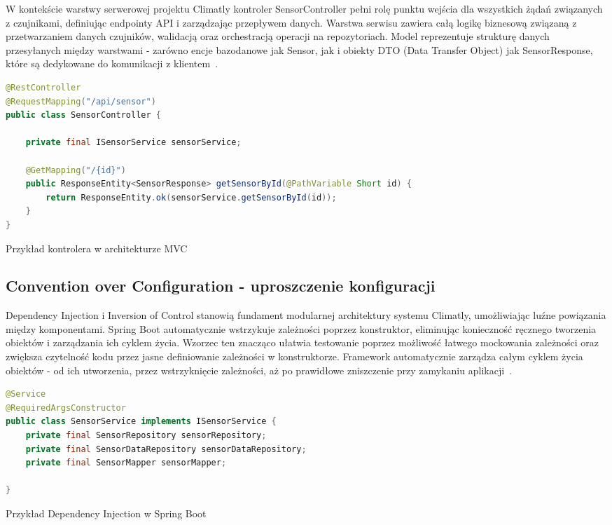 \documentclass[a4paper,12pt,openany]{book}
\begin{document}
W kontekście warstwy serwerowej projektu Climatly kontroler SensorController pełni rolę punktu wejścia dla wszystkich żądań związanych z czujnikami, definiując endpointy API i zarządzając przepływem danych. Warstwa serwisu zawiera całą logikę biznesową związaną z przetwarzaniem danych czujników, walidacją oraz orchestracją operacji na repozytoriach. Model reprezentuje strukturę danych przesyłanych między warstwami - zarówno encje bazodanowe jak Sensor, jak i obiekty DTO (Data Transfer Object) jak SensorResponse, które są dedykowane do komunikacji z klientem~\cite{bib:baeldung2023mvc}.

\begin{lstfloat}[htbp]
\begin{lstlisting}[language=java]
@RestController
@RequestMapping("/api/sensor")
public class SensorController {

    private final ISensorService sensorService;

    @GetMapping("/{id}")
    public ResponseEntity<SensorResponse> getSensorById(@PathVariable Short id) {
        return ResponseEntity.ok(sensorService.getSensorById(id));
    }
}
\end{lstlisting}
\caption{Przykład kontrolera w architekturze MVC}
\label{lst:sensor-controller-mvc}
\end{lstfloat}

\subsection*{Convention over Configuration - uproszczenie konfiguracji}

Dependency Injection i Inversion of Control stanowią fundament modularnej architektury systemu Climatly, umożliwiając luźne powiązania między komponentami. Spring Boot automatycznie wstrzykuje zależności poprzez konstruktor, eliminując konieczność ręcznego tworzenia obiektów i zarządzania ich cyklem życia. Wzorzec ten znacząco ułatwia testowanie poprzez możliwość łatwego mockowania zależności oraz zwiększa czytelność kodu przez jasne definiowanie zależności w konstruktorze. Framework automatycznie zarządza całym cyklem życia obiektów - od ich utworzenia, przez wstrzyknięcie zależności, aż po prawidłowe zniszczenie przy zamykaniu aplikacji~\cite{bib:baeldung2023ioc}.

\begin{lstfloat}[htbp]
\begin{lstlisting}[language=java]
@Service
@RequiredArgsConstructor
public class SensorService implements ISensorService {
    private final SensorRepository sensorRepository;
    private final SensorDataRepository sensorDataRepository;
    private final SensorMapper sensorMapper;

}
\end{lstlisting}
\caption{Przykład Dependency Injection w Spring Boot}
\label{lst:dependency-injection}
\end{lstfloat}
\end{document}
